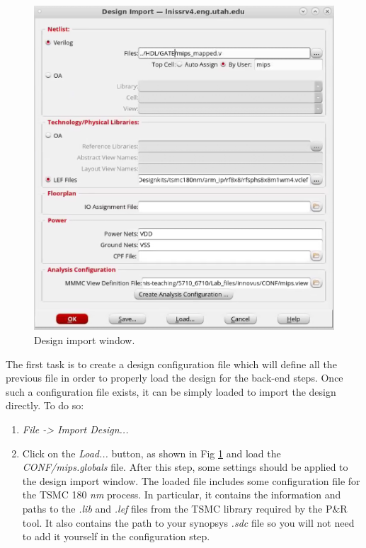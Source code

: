 	\parbox[t]{\dimexpr\textwidth-\leftmargin}{%
		\begin{figure}
			\vspace{0mm}
			\centering
			\vspace{-\baselineskip}
		\includegraphics[scale=0.35]{figures/lab5_backend/mmmc}
\caption{Design import window.}
\label{fig_mmmcview}
		\end{figure}
The first task is to create a design configuration file which will define all the previous file in order to properly load the design for the back-end steps. Once such a configuration file exists, it can be simply loaded to import the design directly. To do so:

\begin{enumerate}
	\item \textit {File -> Import Design...} 
	\item Click on the \textit{Load...} button, as shown in Fig \ref{fig_mmmcview} and load the \textit{CONF/mips.globals} file. After this step, some settings should be applied to the design import window.
	The loaded file includes some configuration file for the TSMC 180 \textit{nm} process. In particular, it contains the information and paths to the \textit{.lib} and \textit{.lef} files from the TSMC library required by the P$\&$R tool. It also contains the path to your synopsys \textit{.sdc} file so you will not need to add it yourself in the configuration step.
\end{enumerate}
	}
			\vspace{5mm}


